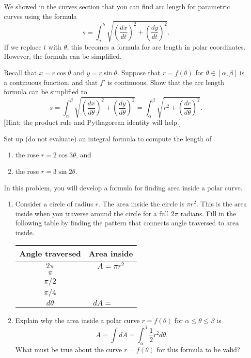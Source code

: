 We showed in the curves section that you can find arc length for parametric curves using the formula 
$$s=\int_a^b\sqrt{\left(\frac{dx}{dt}\right)^2+\left(\frac{dy}{dt}\right)^2}.$$ If we replace $t$ with $\theta$, this becomes a formula for arc length in polar coordinates.  However, the formula can be simplified.

\begin{problem}
Recall that $x=r\cos\theta$ and $y=r\sin\theta$. Suppose that $r=f(\theta)$ for $\theta\in[\alpha,\beta]$ is a continuous function, and that $f'$ is continuous.  
Show that the arc length formula can be simplified to 
$$
s=\int_{\alpha}^{\beta}\sqrt{\left(\frac{dx}{d\theta}\right)^2+\left(\frac{dy}{d\theta}\right)^2} 
= \int_{\alpha}^{\beta}\sqrt{r^2+\left(\frac{dr}{d\theta}\right)^2} .$$
[Hint: the product rule and Pythagorean identity will help.]
\end{problem}

\begin{problem} 
Set up (do not evaluate) an integral formula to compute the length of 
\begin{enumerate}
\item the rose $r=2\cos 3\theta$, and
\item the rose $r=3\sin 2\theta$.
\end{enumerate}
\end{problem}


\begin{problem}
In this problem, you will develop a formula for finding area inside a polar curve.
\begin{enumerate}
\item 
Consider a circle of radius $r$. The area inside the circle is $\pi r^2$. This is the area inside when you traverse around the circle for a full $2\pi$ radians.  Fill in the following table by finding the pattern that connects angle traversed to area inside.
\begin{center}
\begin{tabular}{c|c}
Angle traversed& Area inside\\ \hline
$2\pi$ & $A=\pi r^2$\\
$\pi$ & \\
$\pi/2$ & \\
$\pi/4$ & \\
$d\theta$ & $dA=\quad\quad$
\end{tabular}
\end{center}
\item Explain why the area inside a polar curve $r=f(\theta)$ for $\alpha\leq \theta\leq \beta$ is $$A = \int dA = \int_\alpha^\beta \frac{1}{2}r^2d\theta.$$
What must be true about the curve $r=f(\theta)$ for this formula to be valid?
\end{enumerate}
\end{problem}

